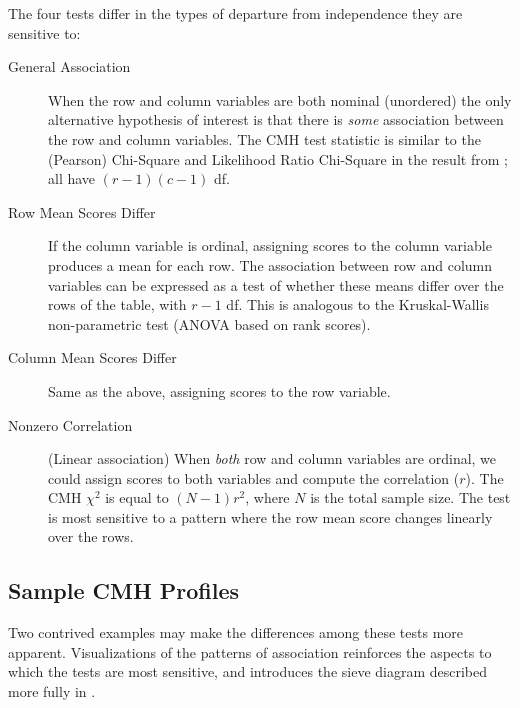 \documentclass[11pt]{book}
\begin{document}
The four tests differ in the types of departure from
independence they are sensitive to:

\begin{description}
\item[General Association]  When the row and column
       variables are both nominal (unordered) the only alternative
       hypothesis of interest is that there is \emph{some} association
       between the row and column variables.  The CMH test statistic
       is similar to the (Pearson) Chi-Square and Likelihood Ratio
       Chi-Square in the result from ; all have \((r - 1) (c -
       1)\) df.

\item[Row Mean Scores Differ]  If the column variable is
       ordinal, assigning scores to the column variable produces a
       mean for each row.  The association between row and column
       variables can be expressed as a test of whether these means
       differ over the rows of the table, with \(r - 1\) df.  This
       is analogous to the Kruskal-Wallis non-parametric test (ANOVA
       based on rank scores).
\item[Column Mean Scores Differ]  Same as the above, assigning scores to
  the row variable.

\item[Nonzero Correlation] (Linear association)  When \emph{both} row and
       column variables are ordinal, we could assign scores to both
       variables and compute the correlation ($r$).  The CMH
       \(\chi^2\) is equal to \(( N - 1) r^2\), where $N$ is the total
       sample size.  The test is most sensitive to a pattern where
       the row mean score changes linearly over the rows.
\end{description}

\subsection{Sample CMH Profiles}\label{sec:Sample}

Two contrived examples may make the differences among these tests
more apparent.  Visualizations of the patterns of association
reinforces the aspects to which the tests are most sensitive,
and introduces the sieve diagram described more fully in .
\end{document}

